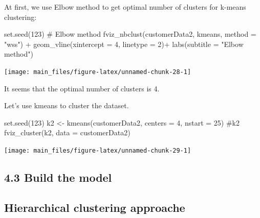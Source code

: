 At first, we use Elbow method to get optimal number of clusters for
k-means clustering:

\begin{Schunk}
\begin{Sinput}
set.seed(123)
# Elbow method
fviz_nbclust(customerData2, kmeans, method = "wss") +
    geom_vline(xintercept = 4, linetype = 2)+
  labs(subtitle = "Elbow method")
\end{Sinput}


\begin{center}\texttt{[image: main\_files/figure-latex/unnamed-chunk-28-1]} \end{center}

\end{Schunk}

It seems that the optimal number of clusters is 4.

Let's use kmeans to cluster the dataset.

\begin{Schunk}
\begin{Sinput}
set.seed(123)
k2 <- kmeans(customerData2, centers = 4, nstart = 25)
#k2
fviz_cluster(k2, data = customerData2)
\end{Sinput}


\begin{center}\texttt{[image: main\_files/figure-latex/unnamed-chunk-29-1]} \end{center}

\end{Schunk}

\begin{Schunk}
\end{Schunk}

\hypertarget{build-the-model-3}{%
\subsection{4.3 Build the model}\label{build-the-model-3}}

\hypertarget{hierarchical-clustering-approache}{%
\subsection{Hierarchical clustering
approache}\label{hierarchical-clustering-approache}}

